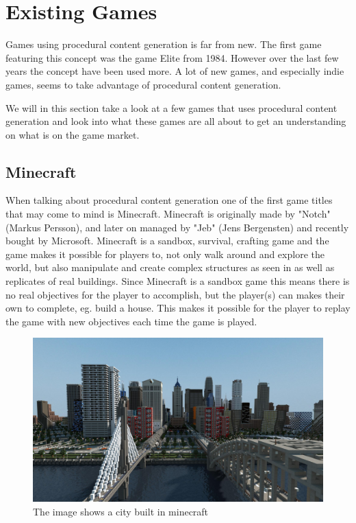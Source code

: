 \section{Existing Games}

Games using procedural content generation is far from new. The first game featuring this concept was the game Elite from 1984\cite{firstpcg}. However over the last few years the concept have been used more. A lot of new games, and especially indie games, seems to take advantage of procedural content generation.

We will in this section take a look at a few games that uses procedural content generation and look into what these games are all about to get an understanding on what is on the game market.


\subsection{Minecraft}

When talking about procedural content generation one of the first game titles that may come to mind is Minecraft. Minecraft is originally made by "Notch" (Markus Persson), and later on managed by "Jeb" (Jens Bergensten)\cite{Minecraft} and recently bought by Microsoft. Minecraft is a sandbox, survival, crafting game and the game makes it possible for players to, not only walk around and explore the world, but also manipulate and create complex structures as seen in  as well as replicates of real buildings. Since Minecraft is a sandbox game this means there is no real objectives for the player to accomplish, but the player(s) can makes their own to complete, eg. build a house. This makes it possible for the player to replay the game with new objectives each time the game is played.

\begin{figure}[H]
	\includegraphics[width=0.7\linewidth]{img/MinecraftCity}
	\centering
	\caption{The image shows a city built in minecraft}
	\label{fig:MinecraftCity}
\end{figure}


